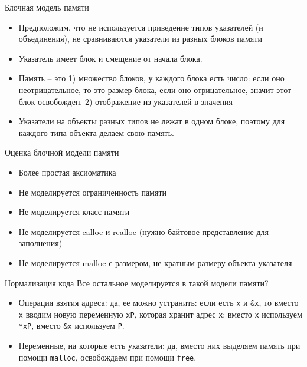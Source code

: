 \documentclass[hyperref={unicode=true}]{beamer}
\begin{document}
    \begin{frame}{Блочная модель памяти}
    \begin{itemize}
    \item Предположим, что не используется приведение
    типов указателей (и объединения), не сравниваются
    указатели из разных блоков памяти
    \item
    Указатель имеет блок и смещение от начала блока.
    \item
    Память -- это 1) множество блоков, у каждого блока есть
    число: если оно неотрицательное, то это размер блока,
    если оно отрицательное, значит этот блок освобожден.
    2) отображение из указателей в значения
    \item
    Указатели на объекты разных типов не лежат в одном блоке,
    поэтому для каждого типа объекта делаем свою память.
    \end{itemize}
    \end{frame}

    \begin{frame}{Оценка блочной модели памяти}
    \begin{itemize}
    \item Более простая аксиоматика
    \item Не моделируется ограниченность памяти
    \item Не моделируется класс памяти
    \item Не моделируется calloc и realloc
    (нужно байтовое представление для заполнения)
    \item Не моделируется malloc с
    размером, не кратным размеру объекта указателя
    \end{itemize}
    \end{frame}

    \begin{frame}{Нормализация кода}
    Все остальное моделируется в такой модели памяти?
    \begin{itemize}
    \item Операция взятия адреса: да, ее можно устранить:
    если есть \texttt{x} и \texttt{\&x}, то вместо \texttt{x}
    вводим новую переменную \texttt{xP}, которая хранит адрес \texttt{x};
    вместо \texttt{x} используем \texttt{*xP}, вместо
    \texttt{\&x} используем \texttt{P}.
    \item Переменные, на которые есть указатели: да,
    вместо них выделяем память при помощи \texttt{malloc},
    освобождаем при помощи \texttt{free}.
    \end{itemize}
    \end{frame}
\end{document}
